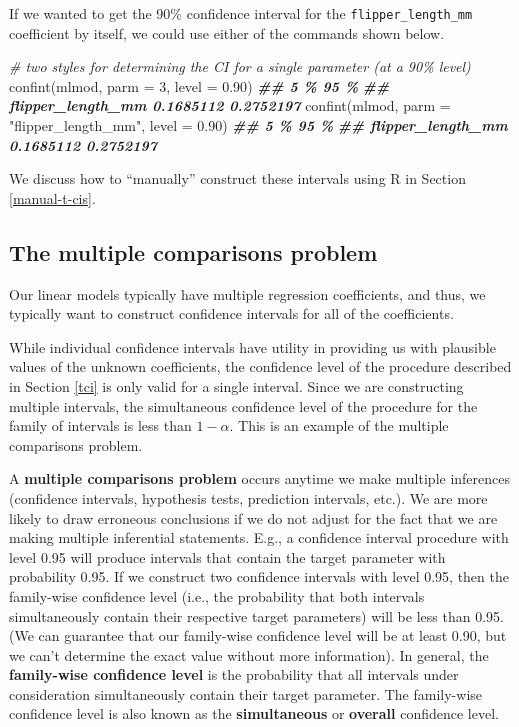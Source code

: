 \documentclass[
]{book}
\newenvironment{Shaded}{\begin{snugshade}}{\end{snugshade}}
\newcommand{\AttributeTok}[1]{\textcolor[rgb]{0.77,0.63,0.00}{#1}}
\newcommand{\CommentTok}[1]{\textcolor[rgb]{0.56,0.35,0.01}{\textit{#1}}}
\newcommand{\DecValTok}[1]{\textcolor[rgb]{0.00,0.00,0.81}{#1}}
\newcommand{\DocumentationTok}[1]{\textcolor[rgb]{0.56,0.35,0.01}{\textbf{\textit{#1}}}}
\newcommand{\FloatTok}[1]{\textcolor[rgb]{0.00,0.00,0.81}{#1}}
\newcommand{\FunctionTok}[1]{\textcolor[rgb]{0.00,0.00,0.00}{#1}}
\newcommand{\NormalTok}[1]{#1}
\newcommand{\StringTok}[1]{\textcolor[rgb]{0.31,0.60,0.02}{#1}}
\theoremstyle{definition}
\theoremstyle{definition}
\theoremstyle{definition}
\theoremstyle{definition}
\theoremstyle{remark}
\begin{document}
If we wanted to get the 90\% confidence interval for the
\texttt{flipper\_length\_mm} coefficient by itself, we could use either of the
commands shown below.

\begin{Shaded}
\begin{Highlighting}[]
\CommentTok{\# two styles for determining the CI for a single parameter (at a 90\% level)}
\FunctionTok{confint}\NormalTok{(mlmod, }\AttributeTok{parm =} \DecValTok{3}\NormalTok{, }\AttributeTok{level =} \FloatTok{0.90}\NormalTok{)}
\DocumentationTok{\#\#                         5 \%      95 \%}
\DocumentationTok{\#\# flipper\_length\_mm 0.1685112 0.2752197}
\FunctionTok{confint}\NormalTok{(mlmod, }\AttributeTok{parm =} \StringTok{"flipper\_length\_mm"}\NormalTok{, }\AttributeTok{level =} \FloatTok{0.90}\NormalTok{)}
\DocumentationTok{\#\#                         5 \%      95 \%}
\DocumentationTok{\#\# flipper\_length\_mm 0.1685112 0.2752197}
\end{Highlighting}
\end{Shaded}

We discuss how to ``manually'' construct these intervals using R in
Section \ref{manual-t-cis}.

\hypertarget{mcp}{%
\subsection{The multiple comparisons problem}\label{mcp}}

Our linear models typically have multiple regression coefficients, and thus, we typically want to construct confidence intervals for all of the coefficients.

While individual confidence intervals have utility in providing us with plausible values of the unknown coefficients, the confidence level of the procedure described in Section \ref{tci} is only valid for a single interval. Since we are constructing multiple intervals, the simultaneous confidence level of the procedure for the family of intervals is less than \(1-\alpha\). This is an example of the multiple comparisons problem.

A \textbf{multiple comparisons problem} occurs anytime we make multiple inferences (confidence intervals, hypothesis tests, prediction intervals, etc.). We are more likely to draw erroneous conclusions if we do not adjust for the fact that we are making multiple inferential statements. E.g., a confidence interval procedure with level 0.95 will produce intervals that contain the target parameter with probability 0.95. If we construct two confidence intervals with level 0.95, then the family-wise confidence level (i.e., the probability that both intervals simultaneously contain their respective target parameters) will be less than 0.95. (We can guarantee that our family-wise confidence level will be at least 0.90, but we can't determine the exact value without more information). In general, the \textbf{family-wise confidence level} is the probability that all intervals under consideration simultaneously contain their target parameter. The family-wise confidence level is also known as the \textbf{simultaneous} or \textbf{overall} confidence level.
\end{document}
